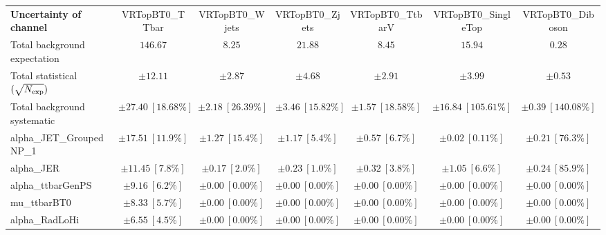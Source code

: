 
\begin{sidewaystable}
\begin{center}
\setlength{\tabcolsep}{0.0pc}
\begin{tabular*}{\textwidth}{@{\extracolsep{\fill}}lcccccc}
\noalign{\smallskip}\hline\noalign{\smallskip}
{\bf Uncertainty of channel}                                    & VRTopBT0\_TTbar            & VRTopBT0\_Wjets            & VRTopBT0\_Zjets            & VRTopBT0\_TtbarV            & VRTopBT0\_SingleTop            & VRTopBT0\_Diboson            \\
\noalign{\smallskip}\hline\noalign{\smallskip}
Total background expectation             &  $146.67$        &  $8.25$        &  $21.88$        &  $8.45$        &  $15.94$        &  $0.28$       \\
\noalign{\smallskip}\hline\noalign{\smallskip}
Total statistical $(\sqrt{N_{\rm exp}})$              & $\pm 12.11$        & $\pm 2.87$        & $\pm 4.68$        & $\pm 2.91$        & $\pm 3.99$        & $\pm 0.53$       \\
Total background systematic               & $\pm 27.40\ [18.68\%] $        & $\pm 2.18\ [26.39\%] $        & $\pm 3.46\ [15.82\%] $        & $\pm 1.57\ [18.58\%] $        & $\pm 16.84\ [105.61\%] $        & $\pm 0.39\ [140.08\%] $             \\
\noalign{\smallskip}\hline\noalign{\smallskip}
\noalign{\smallskip}\hline\noalign{\smallskip}
alpha\_JET\_GroupedNP\_1         & $\pm 17.51\ [11.9\%] $          & $\pm 1.27\ [15.4\%] $          & $\pm 1.17\ [5.4\%] $          & $\pm 0.57\ [6.7\%] $          & $\pm 0.02\ [0.11\%] $          & $\pm 0.21\ [76.3\%] $       \\
alpha\_JER         & $\pm 11.45\ [7.8\%] $          & $\pm 0.17\ [2.0\%] $          & $\pm 0.23\ [1.0\%] $          & $\pm 0.32\ [3.8\%] $          & $\pm 1.05\ [6.6\%] $          & $\pm 0.24\ [85.9\%] $       \\
alpha\_ttbarGenPS         & $\pm 9.16\ [6.2\%] $          & $\pm 0.00\ [0.00\%] $          & $\pm 0.00\ [0.00\%] $          & $\pm 0.00\ [0.00\%] $          & $\pm 0.00\ [0.00\%] $          & $\pm 0.00\ [0.00\%] $       \\
mu\_ttbarBT0         & $\pm 8.33\ [5.7\%] $          & $\pm 0.00\ [0.00\%] $          & $\pm 0.00\ [0.00\%] $          & $\pm 0.00\ [0.00\%] $          & $\pm 0.00\ [0.00\%] $          & $\pm 0.00\ [0.00\%] $       \\
alpha\_RadLoHi         & $\pm 6.55\ [4.5\%] $          & $\pm 0.00\ [0.00\%] $          & $\pm 0.00\ [0.00\%] $          & $\pm 0.00\ [0.00\%] $          & $\pm 0.00\ [0.00\%] $          & $\pm 0.00\ [0.00\%] $       \\

\end{tabular*}
\end{center}
\end{sidewaystable}
